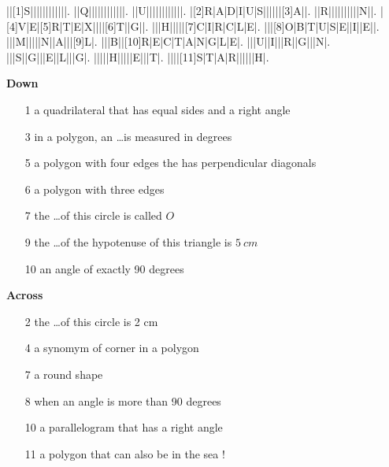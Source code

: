 \documentclass[french,10pt]{book}
\begin{document}
 
\begin{minipage}{0.45\linewidth}
\begin{Puzzle}{13}{14}%
    |{}|[1]S|{}|{}|{}|{}|{}|{}|{}|{}|{}|{}|{}|.
    |{}|Q|{}|{}|{}|{}|{}|{}|{}|{}|{}|{}|{}|.
    |{}|U|{}|{}|{}|{}|{}|{}|{}|{}|{}|{}|{}|.
    |[2]R|A|D|I|U|S|{}|{}|{}|{}|{}|[3]A|{}|.
    |{}|R|{}|{}|{}|{}|{}|{}|{}|{}|{}|N|{}|.
    |[4]V|E|[5]R|T|E|X|{}|{}|{}|[6]T|{}|G|{}|.
    |{}|{}|H|{}|{}|{}|{}|[7]C|I|R|C|L|E|.
    |{}|{}|[8]O|B|T|U|S|E|{}|I|{}|E|{}|.
    |{}|{}|M|{}|{}|{}|{}|N|{}|A|{}|{}|[9]L|.
    |{}|{}|B|{}|[10]R|E|C|T|A|N|G|L|E|.
    |{}|{}|U|{}|I|{}|{}|R|{}|G|{}|{}|N|.
    |{}|{}|S|{}|G|{}|{}|E|{}|L|{}|{}|G|.
    |{}|{}|{}|{}|H|{}|{}|{}|{}|E|{}|{}|T|.
    |{}|{}|{}|[11]S|T|A|R|{}|{}|{}|{}|{}|H|.
\end{Puzzle}
\end{minipage}
\begin{minipage}{0.5\linewidth}
\scriptsize
\textbf{Down}\par
    \begin{enumerate}[font=\sffamily]
        \item[1] a quadrilateral that has equal sides and a right angle
        \item[3] in a polygon, an \ldots is measured in degrees
        \item[5] a polygon with four edges the has perpendicular diagonals
        \item[6] a polygon with three edges
        \item[7] the \ldots of this circle is called $O$
        \item[9] the \ldots of the hypotenuse of this triangle is $5~cm$
        \item[10] an angle of exactly 90 degrees
    \end{enumerate}\medskip
    
\textbf{Across}\par
    \begin{enumerate}[font=\sffamily]
        \item[2] the \ldots of this circle is 2 cm
        \item[4] a synomym of corner in a polygon
        \item[7] a round shape
        \item[8] when an angle is more than 90 degrees
        \item[10] a parallelogram that has a right angle
        \item[11] a polygon that can also be in the sea !
    \end{enumerate}
\end{minipage}
\end{document}
